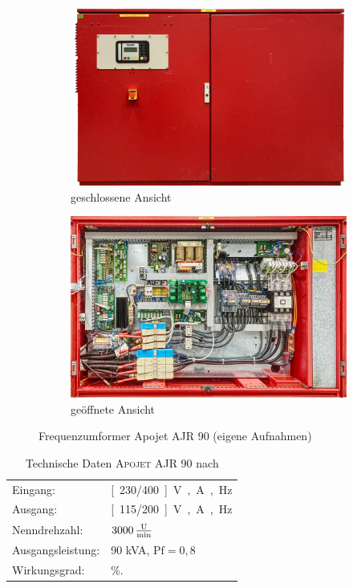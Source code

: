 \begin{figure}
\centering
\begin{subfigure}{.49\textwidth}
	\centering
	\includegraphics[width=\textwidth]{Bilder/Umformer_vorne_geschlossen.pdf}
	\caption{geschlossene Ansicht}
\end{subfigure}
\begin{subfigure}{.49\textwidth}
	\centering
	\includegraphics[width=\textwidth]{Bilder/Umformer_vorne_offen.pdf}
	\caption{geöffnete Ansicht}
\end{subfigure}
\caption{Frequenzumformer Apojet AJR 90 (eigene Aufnahmen)}
\label{fig:RenderbildUmformer}
\end{figure}

\begin{table}[b]
\caption{Technische Daten \textsc{Apojet AJR 90} nach \cite{pillerpowersystemsBetriebshandbuchAPOJET202021}}\label{tab:Leistungsdaten}
\centering
\begin{tabular}{@{}ll@{}}
\toprule
Eingang:         & \unit[230/400]{V}, \unit[145]{A}, \unit[50]{Hz}      \\ 
Ausgang:         & \unit[115/200]{V}, \unit[260]{A}, \unit[400]{Hz} \\
Nenndrehzahl:    & $\unit[3000]{\frac{U}{min}}$                     \\
Ausgangsleistung:& 90 kVA, $\mathrm{Pf}=0,8$                        \\
Wirkungsgrad:    & \unit[85]{\%}.                                   \\ \bottomrule
\end{tabular}
\end{table}

